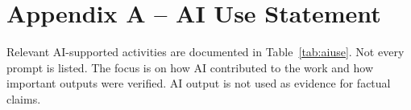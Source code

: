 \clearpage
{}
\section*{Appendix A -- AI Use Statement}
\label{sec:appendixA}
\setcounter{table}{0}
\renewcommand{\thetable}{A.\arabic{table}}
\setcounter{figure}{0}
\renewcommand{\thefigure}{A.\arabic{figure}}

Relevant AI-supported activities are documented in Table~\ref{tab:aiuse}. Not every
prompt is listed. The focus is on how AI contributed to the work and how important
outputs were verified. AI output is not used as evidence for factual claims.

